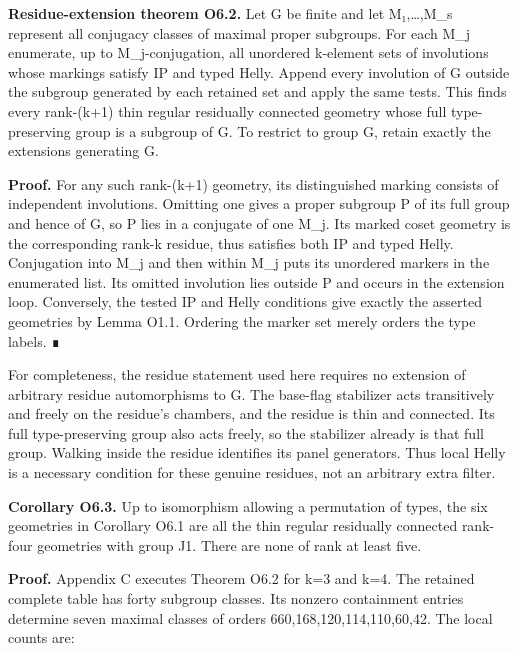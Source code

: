 \documentclass[
  10pt,
  letterpaper,
]{article}
\newcounter{none} %
\begin{document}
\textbf{Residue-extension theorem O6.2.} Let G be finite and let
M₁,\ldots,M\_s represent all conjugacy classes of maximal proper
subgroups. For each M\_j enumerate, up to M\_j-conjugation, all
unordered k-element sets of involutions whose markings satisfy IP and
typed Helly. Append every involution of G outside the subgroup generated
by each retained set and apply the same tests. This finds every
rank-(k+1) thin regular residually connected geometry whose full
type-preserving group is a subgroup of G. To restrict to group G, retain
exactly the extensions generating G.

\textbf{Proof.} For any such rank-(k+1) geometry, its distinguished
marking consists of independent involutions. Omitting one gives a proper
subgroup P of its full group and hence of G, so P lies in a conjugate of
one M\_j. Its marked coset geometry is the corresponding rank-k residue,
thus satisfies both IP and typed Helly. Conjugation into M\_j and then
within M\_j puts its unordered markers in the enumerated list. Its
omitted involution lies outside P and occurs in the extension loop.
Conversely, the tested IP and Helly conditions give exactly the asserted
geometries by Lemma O1.1. Ordering the marker set merely orders the type
labels. ∎

For completeness, the residue statement used here requires no extension
of arbitrary residue automorphisms to G. The base-flag stabilizer acts
transitively and freely on the residue's chambers, and the residue is
thin and connected. Its full type-preserving group also acts freely, so
the stabilizer already is that full group. Walking inside the residue
identifies its panel generators. Thus local Helly is a necessary
condition for these genuine residues, not an arbitrary extra filter.

\textbf{Corollary O6.3.} Up to isomorphism allowing a permutation of
types, the six geometries in Corollary O6.1 are all the thin regular
residually connected rank-four geometries with group J1. There are none
of rank at least five.

\textbf{Proof.} Appendix C executes Theorem O6.2 for k=3 and k=4. The
retained complete table has forty subgroup classes. Its nonzero
containment entries determine seven maximal classes of orders
660,168,120,114,110,60,42. The local counts are:
\end{document}
